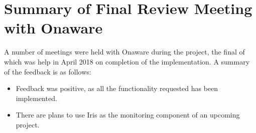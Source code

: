 \documentclass[12pt,a4paper,titlepage]{report}
\begin{document}
\section{Summary of Final Review Meeting with Onaware}
A number of meetings were held with Onaware during the project, the final of which was help in April 2018 on completion of the implementation. A summary of the feedback is as follows:
\begin{itemize}
    \item Feedback was positive, as all the functionality requested has been implemented.
    \item There are plans to use Iris as the monitoring component of an upcoming project.
\end{itemize}

\printbibliography

\clearpage
\end{document}
